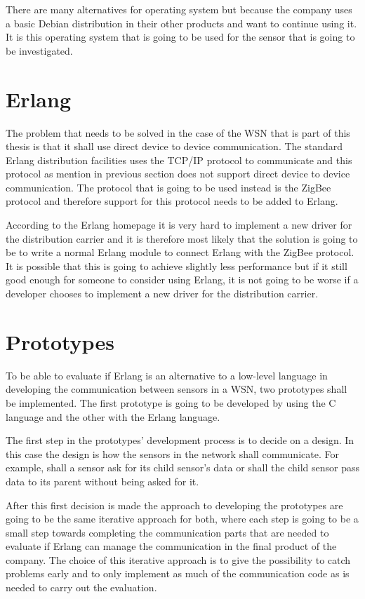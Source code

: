 There are many alternatives for operating system but because the company uses a basic Debian distribution in their other products and want to continue using it. It is this operating system that is going to be used for the sensor that is going to be investigated.

\section{Erlang}
The problem that needs to be solved in the case of the WSN that is part of this thesis is that it shall use direct device to device communication. The standard Erlang distribution facilities uses the TCP/IP protocol to communicate and this protocol as mention in previous section does not support direct device to device communication. The protocol that is going to be used instead is the ZigBee protocol and therefore support for this protocol needs to be added to Erlang. 

According to the Erlang homepage it is very hard to implement a new driver for the distribution carrier and it is therefore most likely that the solution is going to be to write a normal Erlang module to connect Erlang with the ZigBee protocol. It is possible that this is going to achieve slightly less performance but if it still good enough for someone to consider using Erlang, it is not going to be worse if a developer chooses to implement a new driver for the distribution carrier.

\section{Prototypes}
To be able to evaluate if Erlang is an alternative to a low-level language in developing the communication between sensors in a WSN, two prototypes shall be implemented. The first prototype is going to be developed by using the C language and the other with the Erlang language. 

The first step in the prototypes’ development process is to decide on a design. In this case the design is how the sensors in the network shall communicate. For example, shall a sensor ask for its child sensor’s data or shall the child sensor pass data to its parent without being asked for it.

After this first decision is made the approach to developing the prototypes are going to be the same iterative approach for both, where each step is going to be a small step towards completing the communication parts that are needed to evaluate if Erlang can manage the communication in the final product of the company. The choice of this iterative approach is to give the possibility to catch problems early and to only implement as much of the communication code as is needed to carry out the evaluation.

